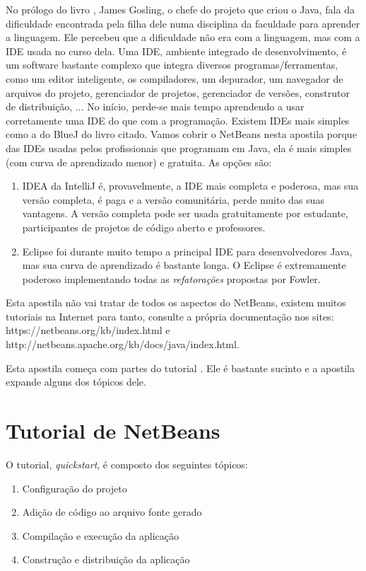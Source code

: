 \documentclass[
	12pt,				%
	twoside,			%
	a4paper,			%
	english,			%
	french,				%
	spanish,			%
	brazil				%
	]{abntex2}
\begin{document}
No prólogo do livro \cite{livro-bluej}, James Gosling, o chefe do projeto que criou o Java, fala da dificuldade encontrada pela filha dele numa disciplina da faculdade para aprender a linguagem. Ele percebeu que a dificuldade não era com a linguagem, mas com a IDE usada no curso dela. Uma IDE, ambiente integrado de desenvolvimento, é um software bastante complexo que integra diversos programas/ferramentas, como um editor inteligente, os compiladores, um depurador, um navegador de arquivos do projeto, gerenciador de projetos, gerenciador de versões, construtor de distribuição, ... No início, perde-se mais tempo aprendendo a usar corretamente uma IDE do que com a programação. Existem IDEs mais simples como a do BlueJ do livro citado. Vamos cobrir o NetBeans nesta apostila porque das IDEs usadas pelos profissionais que programam em Java, ela é mais simples (com curva de aprendizado menor) e gratuita. As opções são:
\begin{enumerate}
\item IDEA da IntelliJ é, provavelmente, a IDE mais completa e poderosa, mas sua versão completa, é paga e a versão comunitária, perde muito das suas vantagens. A versão completa pode ser usada gratuitamente por estudante, participantes de projetos de código aberto e professores.
\item Eclipse foi durante muito tempo a principal IDE para desenvolvedores Java, mas sua curva de aprendizado é bastante longa. O Eclipse é extremamente poderoso implementando todas as \emph{refatorações} propostas por Fowler.
\end{enumerate}

Esta apostila não vai tratar de todos os aspectos do NetBeans, existem muitos tutoriais na Internet para tanto, consulte a própria documentação nos sites: https://netbeans.org/kb/index.html e http://netbeans.apache.org/kb/docs/java/index.html. 

Esta apostila começa com partes do tutorial \cite{netbeans-quick}. Ele é bastante sucinto e a apostila expande alguns dos tópicos dele.

\section{Tutorial de NetBeans }
O tutorial, \textit{quickstart},  é composto dos seguintes tópicos:

\begin{enumerate}
\item Configuração do projeto
\item Adição de código ao arquivo fonte gerado
\item Compilação e execução da aplicação
\item Construção e distribuição da aplicação
\end{enumerate}
\end{document}
